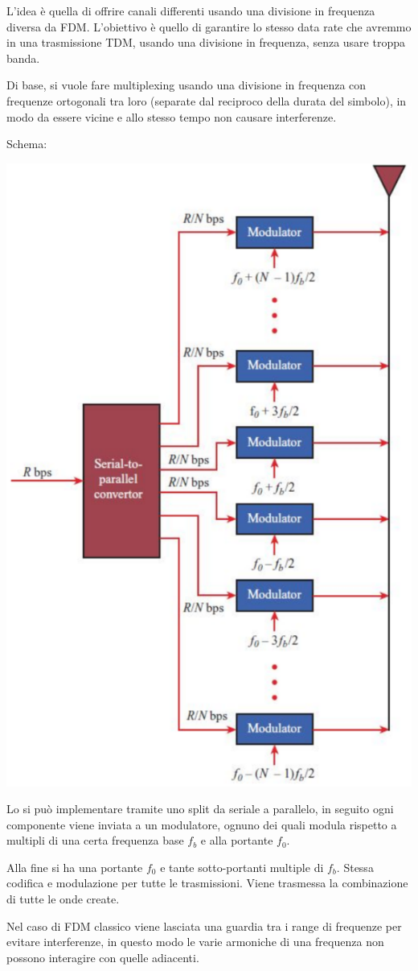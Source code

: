 L'idea è quella di offrire canali differenti usando una divisione in frequenza diversa da FDM. L'obiettivo è quello di garantire lo stesso data rate che avremmo in una trasmissione TDM, usando una divisione in frequenza, senza usare troppa banda.

Di base, si vuole fare multiplexing usando una divisione in frequenza con frequenze ortogonali tra loro (separate dal reciproco della durata del simbolo), in modo da essere vicine e allo stesso tempo non causare interferenze.

Schema:
\begin{center}
	\includegraphics[width=0.6\linewidth]{img/wireless/OFDM1}
\end{center}

Lo si può implementare tramite uno split da seriale a parallelo, in seguito ogni componente viene inviata a un modulatore, ognuno dei quali modula rispetto a multipli di una certa frequenza base $f_b$ e alla portante $f_0$. 

Alla fine si ha una portante $f_0$ e tante sotto-portanti multiple di $f_b$. Stessa codifica e modulazione per tutte le trasmissioni. Viene trasmessa la combinazione di tutte le onde create. 

Nel caso di FDM classico viene lasciata una guardia tra i range di frequenze per evitare interferenze, in questo modo le varie armoniche di una frequenza non possono interagire con quelle adiacenti.

